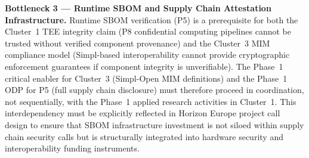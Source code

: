\textbf{Bottleneck 3 --- Runtime SBOM and Supply Chain Attestation Infrastructure.}
Runtime SBOM verification (P5) is a prerequisite for both the Cluster~1 TEE integrity
claim (P8 confidential computing pipelines cannot be trusted without verified component
provenance) and the Cluster~3 MIM compliance model (Simpl-based interoperability
cannot provide cryptographic enforcement guarantees if component integrity is
unverifiable). The Phase~1 critical enabler for Cluster~3 (Simpl-Open MIM definitions)
and the Phase~1 ODP for P5 (full supply chain disclosure) must therefore proceed in
coordination, not sequentially, with the Phase~1 applied research activities in
Cluster~1. This interdependency must be explicitly reflected in Horizon Europe project
call design to ensure that SBOM infrastructure investment is not siloed within supply
chain security calls but is structurally integrated into hardware security and
interoperability funding instruments.


